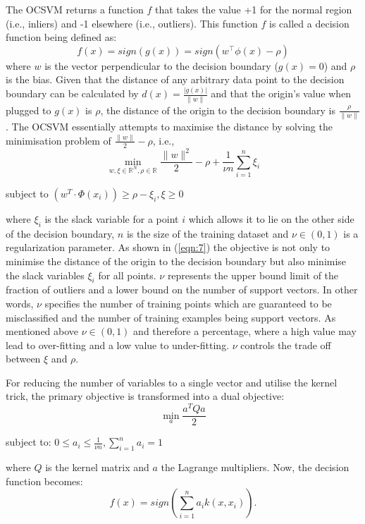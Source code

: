 \documentclass{mpaper}
\begin{document}
The OCSVM returns a function $f$ that takes the value +1 for the normal region (i.e., inliers) and -1 elsewhere (i.e., outliers). This function $f$ is called a decision function being defined as:
\begin{equation}
    f(x) = sign(g(x)) = sign(w^{\top}\phi(x) - \rho)
\end{equation}
where $w$ is the vector perpendicular to the decision boundary ($g(x) = 0 $) and $\rho$ is the bias. 
Given that the distance of any arbitrary data point to the decision boundary can be calculated by $d(x) = \frac{|g(x)|}{\parallel w \parallel}$ and that the origin's value when plugged to $g(x)$ is $\rho$, the distance of the origin to the decision boundary is $\frac{\rho}{\parallel w\parallel}$. The OCSVM essentially attempts to maximise the distance by solving the minimisation problem of $\frac{\parallel w \parallel}{2} - \rho$, i.e.,
\begin{equation}\label{eqn:7}
    \min_{w, \xi \in \mathbb{R}^N, \rho\in\mathbb{R}} \frac{\parallel{w}\parallel^2}{2} - \rho + \frac{1}{\nu n}\sum_{i=1}^n \xi_i 
\end{equation}
\begin{center}
subject to $(w^T \cdot \Phi(x_i)) \geq \rho - \xi_i, \xi \geq 0$
\end{center}
where $\xi_i$ is the slack variable for a point $i$ which allows it to lie on the other side of the decision boundary, $n$ is the size of the training dataset and $\nu \in (0,1)$ is a regularization parameter. As shown in (\ref{eqn:7}) the objective is not only to minimise the distance of the origin to the decision boundary but also minimise the slack variables $\xi_i$ for all points. %
$\nu$ represents the upper bound limit of the fraction of outliers and a lower bound on the number of support vectors. In other words, $\nu$ specifies the number of training points which are guaranteed to be misclassified and the number of training examples being support vectors. As mentioned above $\nu \in (0,1)$ and therefore a percentage, where a high value may lead to over-fitting and a low value to under-fitting. $\nu$ controls the trade off between $\xi$ and $\rho$.

For reducing the number of variables to a single vector and utilise the kernel trick, the primary objective is transformed into a dual objective:
\begin{equation}
    \min_a \frac{a^TQa}{2}
\end{equation}
\begin{center}
    subject to: $0 \leq a_i \leq \frac{1}{\nu n}, \sum_{i=1}^n a_i = 1$
\end{center}
where $Q$ is the kernel matrix and $a$ the Lagrange multipliers. Now, %
the decision function becomes:
\begin{equation}
    f(x) = sign(\sum_{i=1}^n a_i k(x, x_i)).
\end{equation}
\end{document}
